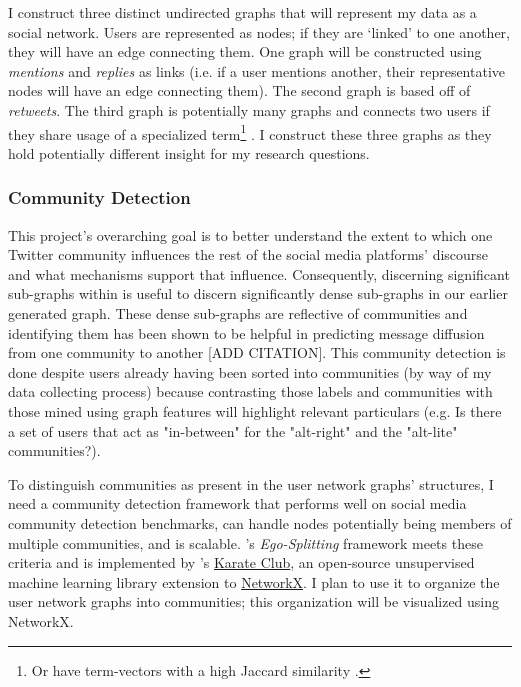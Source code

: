 \documentclass[acmlarge, screen, authorversion]{acmart}
\begin{document}
I construct three distinct undirected graphs that will represent my data as a social network. Users are represented as nodes; if they are `linked' to one another, they will have an edge connecting them. One graph will be constructed using \textit{mentions} and \textit{replies} as links (i.e. if a user mentions another, their representative nodes will have an edge connecting them). The second graph is based off of \textit{retweets}. The third graph is potentially many graphs and connects two users if they share usage of a specialized term\footnote{Or have term-vectors with a high Jaccard similarity \cite{niwattanakulUsingJaccardCoefficient2013}.} . I construct these three graphs as they hold potentially different insight for my research questions. 


    
    \subsubsection{Community Detection}
    
   This project's overarching goal is to better understand the extent to which one Twitter community influences the rest of the social media platforms' discourse and what mechanisms support that influence. Consequently, discerning significant sub-graphs within is useful to discern significantly dense sub-graphs in our earlier generated graph. These dense sub-graphs are reflective of communities and identifying them has been shown to be helpful in predicting message diffusion from one community to another [ADD CITATION]. This community detection is done despite users already having been sorted into communities (by way of my data collecting process) because contrasting those labels and communities with those mined using graph features will highlight relevant particulars (e.g. Is there a set of users that act as "in-between" for the "alt-right" and the "alt-lite" communities?).
   
   To distinguish communities as present in the user network graphs' structures, I need a community detection framework that performs well on social media community detection benchmarks, can handle nodes potentially being members of multiple communities, and is scalable. \citet{epastoEgoSplittingFrameworkNonOverlapping2017}'s \textit{Ego-Splitting} framework meets these criteria and is implemented by \citet{rozemberczkiAPIOrientedOpensource2020}'s \href{https://github.com/benedekrozemberczki/karateclub}{Karate Club}, an open-source unsupervised machine learning library extension to \href{https://networkx.github.io/}{NetworkX}. I plan to use it to organize the user network graphs into communities; this organization will be visualized using NetworkX.
\end{document}

